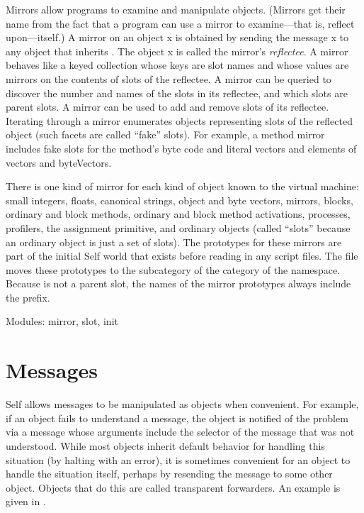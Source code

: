 \documentclass[letterpaper,10pt,english]{sphinxmanual}
\begin{document}
Mirrors allow programs to examine and manipulate objects. (Mirrors get their name from the fact
that a program can use a mirror to examine—that is, reflect upon—itself.) A mirror on an object x
is obtained by sending the message  x to any object that inherits .
The object x is called the mirror’s \emph{reflectee}. A mirror behaves like a keyed collection whose keys
are slot names and whose values are mirrors on the contents of slots of the reflectee. A mirror can
be queried to discover the number and names of the slots in its reflectee, and which slots are parent
slots. A mirror can be used to add and remove slots of its reflectee. Iterating through a mirror enumerates
objects representing slots of the reflected object (such facets are called “fake” slots). For
example, a method mirror includes fake slots for the method’s byte code and literal vectors and elements
of vectors and byteVectors.

There is one kind of mirror for each kind of object known to the virtual machine: small integers,
floats, canonical strings, object and byte vectors, mirrors, blocks, ordinary and block methods, ordinary
and block method activations, processes, profilers, the assignment primitive, and ordinary
objects (called “slots” because an ordinary object is just a set of slots). The prototypes for these
mirrors are part of the initial Self world that exists before reading in any script files. The file
 moves these prototypes to the  subcategory of the  category of
the  namespace. Because  is not a parent slot, the names of the mirror prototypes
always include the  prefix.

Modules: mirror, slot, init


\section{Messages}
\label{messages:messages}\label{messages::doc}
Self allows messages to be manipulated as objects when convenient. For example, if an object
fails to understand a message, the object is notified of the problem via a message whose arguments
include the selector of the message that was not understood. While most objects inherit default
behavior for handling this situation (by halting with an error), it is sometimes convenient for an object
to handle the situation itself, perhaps by resending the message to some other object. Objects
that do this are called transparent forwarders. An example is given in .
\end{document}
